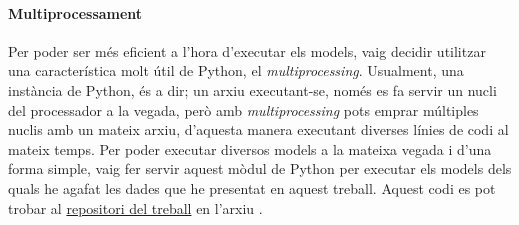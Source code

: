 \paragraph{Multiprocessament}
Per poder ser més eficient a l'hora d'executar els models, vaig decidir utilitzar una característica molt útil de Python, el \textit{multiprocessing}. Usualment, una instància de Python, és a dir; un arxiu executant-se, només es fa servir un nucli del processador a la vegada, però amb \textit{multiprocessing} pots emprar múltiples nuclis amb un mateix arxiu, d'aquesta manera executant diverses línies de codi al mateix temps. Per poder executar diversos models a la mateixa vegada i d'una forma simple, vaig fer servir aquest mòdul de Python per executar els models dels quals he agafat les dades que he presentat en aquest treball. Aquest codi es pot trobar al \href{https://github.com/tomiock/qGAN}{repositori del treball} en l'arxiu .

